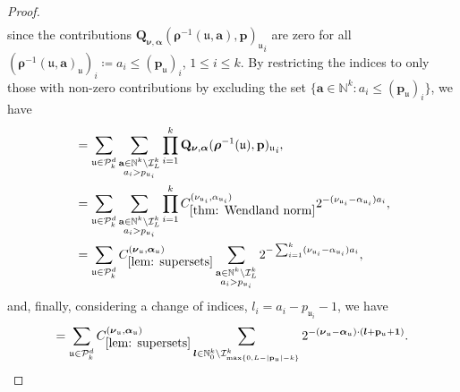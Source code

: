 \documentclass[pdflatex,sn-mathphys-num]{sn-jnl}%
\theoremstyle{thmstyleone}%
\theoremstyle{thmstyletwo}%
\theoremstyle{thmstylethree}%
\begin{document}
\begin{proof}
\begin{align}
    \end{align}
    since the contributions \({\mathbf{Q}_{\boldsymbol{\nu},\boldsymbol{\alpha}}(\boldsymbol{\rho}^{-1}(\mathfrak{u},\mathbf{a}),\mathbf{p})_{\mathfrak{u}}}_i\) are zero for all \((\boldsymbol{\rho}^{-1}(\mathfrak{u},\mathbf{a})_{\mathfrak{u}})_i\coloneqq a_i\leq(\mathbf{p}_{\mathfrak{u}})_i\), \(1\leq i\leq k\). By restricting the indices to only those with non-zero contributions by excluding the set \(\{\mathbf{a}\in\mathbb{N}^k:a_i\leq (\mathbf{p}_{\mathfrak{u}})_i\}\), we have
    \begin{align}
        &=\sum_{\mathfrak{u}\in\mathcal{P}^d_k}\sum_{\substack{\mathbf{a}\in\mathbb{N}^k\setminus\mathcal{I}_L^k\\a_i> p_{\mathfrak{u}_i}}}\prod_{i=1}^k{\mathbf{Q}_{\boldsymbol{\nu},\boldsymbol{\alpha}}(\boldsymbol{\rho}^{-1}(\mathfrak{u}),\mathbf{p})_{\mathfrak{u}}}_i,\nonumber\\
        &=\sum_{\mathfrak{u}\in\mathcal{P}^d_k}\sum_{\substack{\mathbf{a}\in\mathbb{N}^k\setminus\mathcal{I}_L^k\\a_i > p_{\mathfrak{u}_i}}}\prod_{i=1}^kC_{\ref{thm: Wendland norm}}^{(\nu_{\mathfrak{u}_i},\alpha_{\mathfrak{u}_i})}2^{-(\nu_{\mathfrak{u}_i}-\alpha_{\mathfrak{u}_i})
        a_i},\nonumber\\
        &=\sum_{\mathfrak{u}\in\mathcal{P}^d_k}C_{\ref{lem: supersets}}^{(\boldsymbol{\nu}_{\mathfrak{u}},\boldsymbol{\alpha}_{\mathfrak{u}})}\sum_{\substack{\mathbf{a}\in\mathbb{N}^k\setminus\mathcal{I}_L^k\\a_i > p_{\mathfrak{u}_i}}}2^{-\sum_{i=1}^k({\nu}_{\mathfrak{u}_i}-{\alpha}_{\mathfrak{u}_i})a_i},\nonumber
    \end{align}
    and, finally, considering a change of indices, \(l_i = a_i-p_{\mathfrak{u}_i}-1\), we have
    \begin{align}
        =\sum_{\mathfrak{u}\in\mathcal{P}^d_k}C_{\ref{lem: supersets}}^{(\boldsymbol{\nu}_{\mathfrak{u}},\boldsymbol{\alpha}_{\mathfrak{u}})}\sum_{\boldsymbol{l}\in\mathbb{N}_0^k\setminus\mathcal{I}_{\max\{0,L-|\mathbf{p}_{\mathfrak{u}}|-k\}}^k}2^{-(\boldsymbol{\nu}_{\mathfrak{u}}-\boldsymbol{\alpha}_{\mathfrak{u}})\cdot(\boldsymbol{l}+\mathbf{p}_{\mathfrak{u}}+\mathbf{1})}.\nonumber
    \end{align}
\end{proof}
\end{document}
